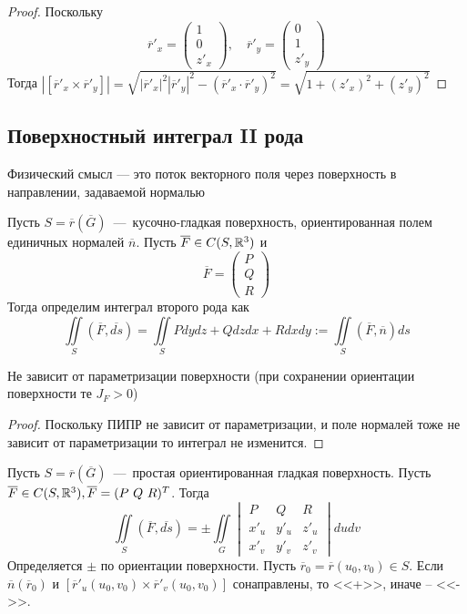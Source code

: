 \begin{proof}
    Поскольку \[
    \overline{r}'_x = \begin{pmatrix}
        1 \\ 0 \\ z'_x
    \end{pmatrix}, \quad \overline{r}'_y = \begin{pmatrix}
        0 \\ 1 \\ z'_y
    \end{pmatrix}
    \]
    Тогда $|[\overline{r}'_x \times \overline{r}'_y]| = \sqrt{|\overline{r}'_x|^2|\overline{r}'_y|^2 - (\overline{r}'_x\cdot \overline{r}'_y)^2} = \sqrt{1 + (z'_x)^2 + (z'_y)^2}$
\end{proof}

\subsection{Поверхностный интеграл II рода}
Физический смысл --- это поток векторного поля через поверхность в направлении, задаваемой нормалью
\begin{definition}
    Пусть $S = \overline{r}(\overline{G})$~---~кусочно-гладкая поверхность, ориентированная полем единичных нормалей $\overline{n}$. Пусть $\overline{F} \in C(S, \mathbb{R}^3)$ и \[
    \overline{F} = 
    \begin{pmatrix}
        P \\ Q \\ R
    \end{pmatrix}
    \]
    Тогда определим интеграл второго рода как \[
    \iint\limits_S (\overline{F}, \overline{ds}) = \iint\limits_S Pdydz + Qdzdx + Rdxdy := \iint\limits_S (\overline{F}, \overline{n})ds
    \]
\end{definition}
\begin{lemma}
    Не зависит от параметризации поверхности (при сохранении ориентации поверхности те $J_F > 0$)
\end{lemma}
\begin{proof}   
    Поскольку ПИПР не зависит от параметризации, и поле нормалей тоже не зависит от параметризации то интеграл не изменится.
\end{proof}
\begin{lemma}
    Пусть $S = \overline{r}(\overline{G})$~---~простая ориентированная гладкая поверхность. Пусть $\overline{F} \in C(S, \mathbb{R}^3), \overline{F} = (P \ Q \ R)^T$. Тогда \[\iint\limits_S (\overline{F}, \overline{ds}) = \pm \iint\limits_G \begin{vmatrix}
        P & Q & R \\ x'_u & y'_u & z'_u \\ x'_v & y'_v & z'_v
    \end{vmatrix} dudv
    \]
    Определяется $\pm$ по ориентации поверхности. Пусть $\overline{r}_0 = \overline{r}(u_0, v_0) \in S$. Если $\overline{n}(\overline{r}_0)$ и $[\overline{r}'_u(u_0, v_0) \times \overline{r}'_v(u_0, v_0)]$ сонаправлены, то <<+>>, иначе -- <<->>.
\end{lemma}
